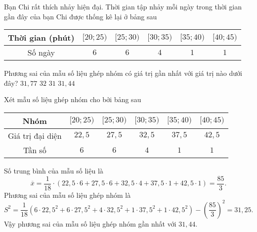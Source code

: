 \begin{ex}%
	Bạn Chi rất thích nhảy hiện đại. Thời gian tập nhảy mỗi ngày trong thời gian gần đây của bạn Chi được thống kê lại ở bảng sau
	\begin{center}
		\begin{tabular}{|c|c|c|c|c|c|}
			\hline
			Thời gian (phút) & $[20;25)$ & $[25;30)$ & $[30;35)$ & $[35;40)$ & $[40;45)$ \\
			\hline
			Số ngày          & $6$       & $6$       & $4$       & $1$       & $1$       \\
			\hline
		\end{tabular}
	\end{center}
	Phương sai của mẫu số liệu ghép nhóm có giá trị gần nhất với giá trị nào dưới đây?
	\choice
	{$31{,}77$}
	{$32$}
	{$31$}
	{\True $31{,}44$}
	\loigiai
	{
	Xét mẫu số liệu ghép nhóm cho bởi bảng sau
	\begin{center}
		\begin{tabular}{|c|c|c|c|c|c|}
			\hline
			Nhóm             & $[20;25)$ & $[25;30)$ & $[30;35)$ & $[35;40)$ & $[40;45)$ \\
			\hline
			Giá trị đại diện & $22{,}5$  & $27{,}5$  & $32{,}5$  & $37{,}5$  & $42{,}5$  \\
			\hline
			Tần số           & $6$       & $6$       & $4$       & $1$       & $1$       \\
			\hline
		\end{tabular}
	\end{center}
	Số trung bình của mẫu số liệu là
	$$\overline{x}=\dfrac{1}{18}\cdot (22{,}5\cdot 6+27{,}5\cdot 6+32{,}5\cdot 4+37{,}5\cdot 1+42{,}5\cdot 1)=\dfrac{85}{3}.$$
	Phương sai của mẫu số liệu ghép nhóm là
	$$S^2=\dfrac{1}{18}\left(6\cdot 22{,}5^2+6\cdot 27{,}5^2+4\cdot 32{,}5^2+1\cdot 37{,}5^2+1\cdot 42{,}5^2\right)-\left(\dfrac{85}{3}\right)^2=31{,}25.$$
	Vậy phương sai của mẫu số liệu ghép nhóm gần nhất với $31{,}44$.
	}
\end{ex}

